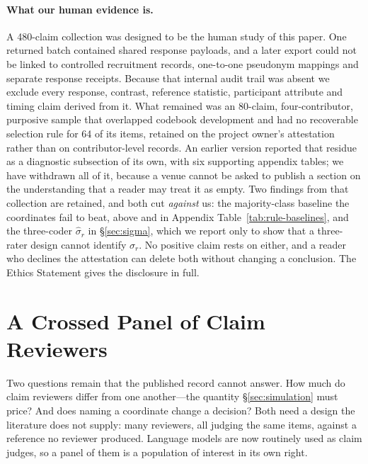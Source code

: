 \documentclass[11pt]{article}
\begin{document}
\paragraph{What our human evidence is.}
\label{sec:development}
A 480-claim collection was designed to be the human study of this paper. One
returned batch contained shared response payloads, and a later export could not
be linked to controlled recruitment records, one-to-one pseudonym mappings and
separate response receipts. Because that internal audit trail was absent we
exclude every response, contrast, reference statistic, participant attribute and
timing claim derived from it. What remained was an 80-claim, four-contributor,
purposive sample that overlapped codebook development and had no recoverable
selection rule for 64 of its items, retained on the project owner's attestation
rather than on contributor-level records. An earlier version reported that
residue as a diagnostic subsection of its own, with six supporting appendix
tables; we have withdrawn all of it, because a venue cannot be asked to publish
a section on the understanding that a reader may treat it as empty. Two
findings from that collection are retained, and both cut \emph{against} us: the
majority-class baseline the coordinates fail to beat, above and in Appendix
Table~\ref{tab:rule-baselines}, and the three-coder $\hat\sigma_r$ in
\S\ref{sec:sigma}, which we report only to show that a three-rater design
cannot identify $\sigma_r$. No positive claim rests on either, and a reader who
declines the attestation can delete both without changing a conclusion. The
Ethics Statement gives the disclosure in full.

\section{A Crossed Panel of Claim Reviewers}
\label{sec:controlled-models}

Two questions remain that the published record cannot answer. How much do claim
reviewers differ from one another---the quantity \S\ref{sec:simulation} must
price? And does naming a coordinate change a decision? Both need a design the
literature does not supply: many reviewers, all judging the same items, against
a reference no reviewer produced. Language models are now routinely used as
claim judges, so a panel of them is a population of interest in its own right.
\end{document}
